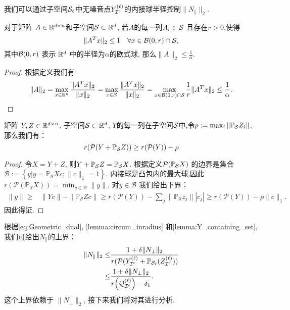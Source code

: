 我们可以通过子空间\(\mathcal{S}_\ell\)中无噪音点\(Y^{(\ell)}_{\mathcal{I}^c}\)的内接球半径控制\(\|N_{\parallel}\|_2\).
\begin{lemma}\label{lemma:circum_inradius}
  对于矩阵 \(A \in \mathbb{R}^{d \times n}\)和子空间\(\mathcal{S}\subset \mathbb{R}^d\), 
  若\(A\)的每一列\(A_i \in \mathcal{S}\) 且存在\(r>0\),使得
  \[\|A^Tx\|_2 \leq 1 \quad \forall x \in \mathcal{B}(0, r)\cap \mathcal{S},\]
  其中\(\mathcal{B}(0, r)\) 表示 \(\mathbb{R}^d\) 中的半径为\(\alpha\)的欧式球,
  那么\(\|A\|_2 \leq \frac{1}{\alpha}\).
\end{lemma}
\begin{proof}
  根据定义我们有
  \begin{align*}
    \|A\|_2 = \max_{x\in \mathbb{R}^n} \frac{\|A^Tx\|_2}{\|x\|_2}
    = \max_{x \in \mathcal{S}} \frac{\|A^Tx\|_2}{\|x\|_2}
    = \max_{x \in \mathcal{B}(0,r) \cap \mathcal{S}} \frac{1}{r} \|A^Tx\|_2
    \leq \frac{1}{\alpha}.
  \end{align*}
\end{proof}

\begin{lemma}\label{lemma:Y_containing_set}
  矩阵 \(Y, Z\in \mathbb{R}^{d \times n}\), 子空间\(\mathcal{S} \subset \mathbb{R}^d\),
  \(Y\)的每一列在子空间\(\mathcal{S}\)中,令\(\rho:=\max_{i}\|\mathbb{P}_{\mathcal{S}} Z_i\|\),
  那么我们有：
  \begin{equation*}
    r(\mathcal{P}(Y+\mathbb{P}_{\mathcal{S}} Z)) \geq r(\mathcal{P}(Y)) - \rho
  \end{equation*}
\end{lemma}
\begin{proof}
  令\(X=Y+Z\), 则\(Y+\mathbb{P}_{\mathcal{S}} Z=\mathbb{P}_{\mathcal{S}} X\). 根据定义\(\mathcal{P}(\mathbb{P}_{\mathcal{S}} X)\) 的边界是集合 \(\mathcal{B}:=
  \left\{y|y=\mathbb{P}_\mathcal{S} X c; \|c\|_1=1\right\}\).
  内接球是凸包内的最大球,因此 \(r(\mathcal{P}(\mathbb{P}_\mathcal{S} X)) =
  \min_{y\in \mathcal{B}} \|y\|\). 对\(y \in \mathcal{B} \) 我们给出下界：
  \begin{align*}
    \|y\| \geq& \|Yc\|-\|\mathbb{P}_\mathcal{S}Z c\|\geq r(\mathcal{P}(Y)) - {\sum}_j{\|\mathbb{P}_\mathcal{S}z_j}\||c_j|
    \geq r(\mathcal{P}(Y)) - \rho\|c\|_1.
  \end{align*}
  因此得证.
\end{proof}

根据\eqref{eq:Geometric_dual},  \autoref{lemma:circum_inradius} 和\autoref{lemma:Y_containing_set},  
我们可给出\(N_{\parallel}\)的上界：
\begin{align}
  \|N_{\parallel}\|_2 \leq& \frac{1+\delta\|N_{\perp}\|_2}
  {r(\mathcal{P}(Y_{\mathcal{I}^c}^{(\ell)}+\mathbb{P}_{\mathcal{S}_{\ell}}(Z_{\mathcal{I}^c}^{(\ell)}))}
  \nonumber \\
  \leq& \frac{1+\delta\|N_{\perp}\|_2}{r{\left( \mathcal{Q}_{\mathcal{I}^c}^{(\ell)}\right)}-\delta_1}.\label{eq:nu1_bound}
\end{align}
这个上界依赖于 \(\|N_{\perp}\|_2\), 接下来我们将对其进行分析.

